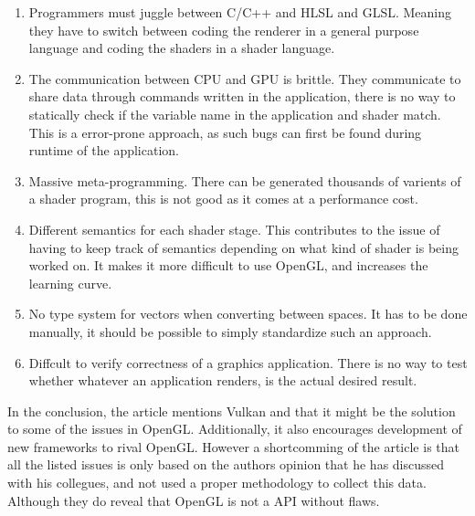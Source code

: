 \begin{enumerate}
\item Programmers must juggle between C/C++ and \gls{HLSL} and \gls{GLSL}.
Meaning they have to switch between coding the renderer in a general purpose language and coding the shaders in a shader language.

\item The communication between \gls{CPU} and \gls{GPU} is brittle. 
They communicate to share data through commands written in the application, there is no way to statically check if the variable name in the application and shader match.
This is a error-prone approach, as such bugs can first be found during runtime of the application. 

\item Massive meta-programming. 
There can be generated thousands of varients of a shader program, this is not good as it comes at a performance cost. 

\item Different semantics for each shader stage. 
This contributes to the issue of having to keep track of semantics depending on what kind of shader is being worked on.
It makes it more difficult to use OpenGL, and increases the learning curve. 

\item No type system for vectors when converting between spaces. 
It has to be done manually, it should be possible to simply standardize such an approach.

\item Diffcult to verify correctness of a graphics application. 
There is no way to test whether whatever an application renders, is the actual desired result.
\end{enumerate}

In the conclusion, the article mentions Vulkan and that it might be the solution to some of the issues in OpenGL. 
Additionally, it also encourages development of new frameworks to rival OpenGL. 
However a shortcomming of the article is that all the listed issues is only based on the authors opinion that he has discussed with his collegues, and not used a proper methodology to collect this data. 
Although they do reveal that OpenGL is not a \gls{API} without flaws.

